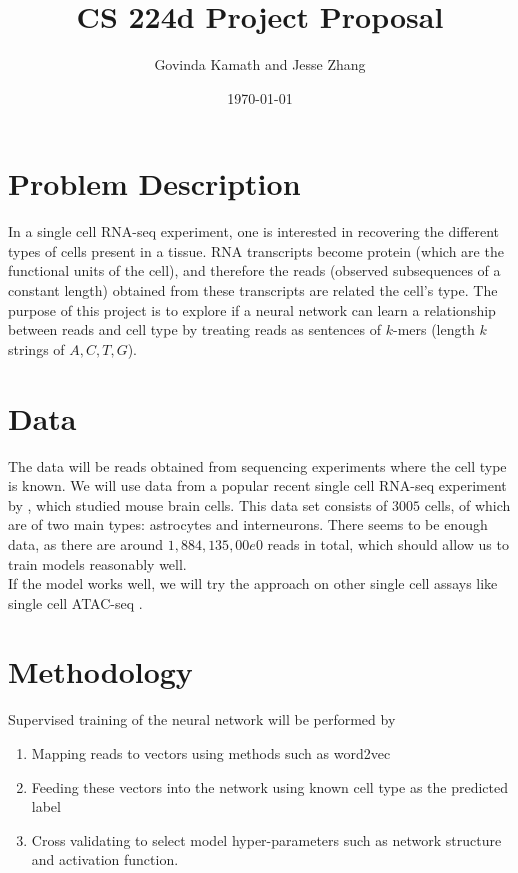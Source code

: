 \documentclass[11pt,onecolumn]{article}
\title{CS 224d Project Proposal}
\author{Govinda Kamath and Jesse Zhang}
\date{\today}
\begin{document}
\maketitle
 
\section{Problem Description}
In a single cell RNA-seq experiment, one is interested in recovering the different types of cells present in a tissue. RNA transcripts become protein (which are the functional units of the cell), and therefore the reads (observed subsequences of a constant length) obtained from these transcripts are related the cell's type. The purpose of this project is to explore if a neural network can learn a relationship between reads and cell type by treating reads as sentences of $k$-mers (length $k$ strings of $A, C, T, G$).


\section{Data}
The data will be reads obtained from sequencing experiments where the cell type is known. We will use data from a popular recent single cell RNA-seq experiment by \cite{ZeiLin}, which studied mouse brain cells. This data set consists of $3005$ cells, of which are of two main types: astrocytes and interneurons. There seems to be enough data, as there are around $1,884,135,00e0$ reads in total, which should allow us to train models reasonably well. \\

If the model works well, we will try the approach on other single cell assays like single cell ATAC-seq \cite{BueGre}. 

\section{Methodology}
Supervised training of the neural network will be performed by
\begin{enumerate}
	\item Mapping reads to vectors using methods such as word2vec
	\item Feeding these vectors into the network using known cell type as the predicted label
	\item Cross validating to select model hyper-parameters such as network structure and activation function. 
\end{enumerate}
\end{document}
